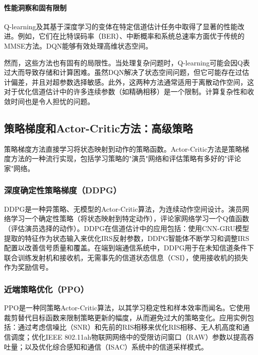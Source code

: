 \documentclass[journal]{IEEEtran}
\begin{document}
\paragraph{性能洞察和固有限制}
Q-learning及其基于深度学习的变体在特定信道估计任务中取得了显著的性能改进。例如，它们在比特误码率（BER）、中断概率和系统总速率方面优于传统的MMSE方法\cite{ref15}。DQN能够有效处理高维状态空间\cite{ref19}。

然而，这些方法也有固有的局限性。当处理复杂问题时，Q-learning可能会因Q表过大而导致存储和计算困难\cite{ref15}。虽然DQN解决了状态空间问题，但它可能存在过估计偏差\cite{ref7}，并且对超参数选择敏感\cite{ref19}。此外，这两种方法通常适用于离散动作空间，这对于优化信道估计中的许多连续参数（如精确相移）是一个限制\cite{ref7}。计算复杂性和收敛时间也是令人担忧的问题\cite{ref15}。

\subsection{策略梯度和Actor-Critic方法：高级策略}

策略梯度方法直接学习将状态映射到动作的策略函数。Actor-Critic方法是策略梯度方法的一种流行实现，包括学习策略的"演员"网络和评估策略有多好的"评论家"网络。

\subsubsection{深度确定性策略梯度（DDPG）}
DDPG是一种异策略、无模型的Actor-Critic算法，为连续动作空间设计。演员网络学习一个确定性策略（将状态映射到特定动作），评论家网络学习一个Q值函数（评估演员选择的动作）\cite{ref1}。DDPG在信道估计中的应用包括：使用CNN-GRU模型提取的特征作为状态输入来优化IRS反射参数，DDPG智能体不断学习和调整IRS配置以改善信号质量和覆盖\cite{ref1}。在端到端通信系统中，DDPG用于在未知信道条件下联合训练发射机和接收机，无需事先的信道状态信息（CSI），使用接收机的损失作为奖励信号\cite{ref10}。

\subsubsection{近端策略优化（PPO）}
PPO是一种同策略Actor-Critic算法，以其学习稳定性和样本效率而闻名。它使用裁剪替代目标函数来限制策略更新的幅度，从而避免过大的策略变化\cite{ref7}。应用实例包括：通过考虑信噪比（SNR）和先前的RIS相移来优化RIS相移、无人机高度和通信调度\cite{ref7}；优化IEEE 802.11ah物联网网络中的受限访问窗口（RAW）参数以提高吞吐量\cite{ref10}；以及优化综合感知和通信（ISAC）系统中的信道采样模式\cite{ref28}。
\end{document}
